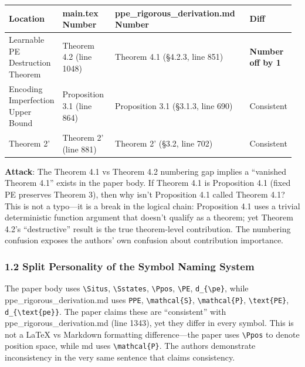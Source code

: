 \documentclass[
  12pt,
]{article}
\begin{document}
\begin{longtable}[]{@{}p{0.10\linewidth}p{0.22\linewidth}p{0.55\linewidth}p{0.10\linewidth}@{}}
\toprule\noalign{}
\begin{minipage}[b]{\linewidth}\raggedright
Location
\end{minipage} & \begin{minipage}[b]{\linewidth}\raggedright
main.tex Number
\end{minipage} & \begin{minipage}[b]{\linewidth}\raggedright
ppe\_rigorous\_derivation.md Number
\end{minipage} & \begin{minipage}[b]{\linewidth}\raggedright
Diff
\end{minipage} \\
\midrule\noalign{}
\endhead
\bottomrule\noalign{}
\endlastfoot
Learnable PE Destruction Theorem & Theorem 4.2 (line 1048) & Theorem 4.1 (\S4.2.3, line 851) &
\textbf{Number off by 1} \\
Encoding Imperfection Upper Bound & Proposition 3.1 (line 864) & Proposition 3.1 (\S3.1.3, line 690) &
Consistent \\
Theorem 2' & Theorem 2' (line 881) & Theorem 2' (\S3.2, line 702) &
Consistent \\
\end{longtable}

\textbf{Attack}: The Theorem 4.1 vs Theorem 4.2 numbering gap implies a ``vanished Theorem 4.1'' exists in the paper body. If Theorem 4.1 is Proposition 4.1 (fixed PE preserves Theorem 3), then why isn't Proposition 4.1 called Theorem 4.1? This is not a typo---it is a break in the logical chain: Proposition 4.1 uses a trivial deterministic function argument that doesn't qualify as a theorem; yet Theorem 4.2's ``destructive'' result is the true theorem-level contribution. The numbering confusion exposes the authors' own confusion about contribution importance.

\subsubsection{1.2 Split Personality of the Symbol Naming System}\label{split-personality-symbols}

The paper body uses \texttt{\textbackslash{}Situs}, \texttt{\textbackslash{}Sstates}, \texttt{\textbackslash{}Ppos}, \texttt{\textbackslash{}PE}, \texttt{d\_\{\textbackslash{}pe\}}, while ppe\_rigorous\_derivation.md uses \texttt{PPE}, \texttt{\textbackslash{}mathcal\{S\}}, \texttt{\textbackslash{}mathcal\{P\}}, \texttt{\textbackslash{}text\{PE\}}, \texttt{d\_\{\textbackslash{}text\{pe\}\}}. The paper claims these are ``consistent'' with ppe\_rigorous\_derivation.md (line 1343), yet they differ in every symbol. This is not a LaTeX vs Markdown formatting difference---the paper uses \texttt{\textbackslash{}Ppos} to denote position space, while md uses \texttt{\textbackslash{}mathcal\{P\}}. The authors demonstrate inconsistency in the very same sentence that claims consistency.
\end{document}
